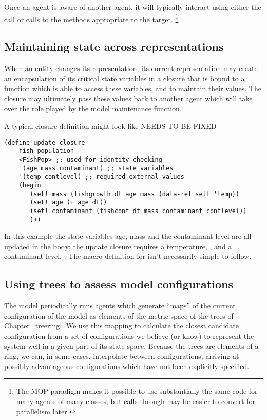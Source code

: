 Once an agent is aware of another agent, it will typically interact
using either the  call or calls to the methods
appropriate to the target. \footnote{The MOP paradigm makes it possible to use
substantially the same code for many agents of many classes, but calls
through  may be easier to convert for parallelism later.}


\subsection{Maintaining state across representations}

When an entity changes its representation, its current representation
may create an encapsulation of its critical state variables in a
closure that is bound to a function which is able to access these
variables, and to maintain their values. The closure may ultimately pass these
values back to another agent which will take over the role played by
the model maintenance function.

A typical closure definition might look like
\Huge{NEEDS TO BE FIXED}
\begin{verbatim}
(define-update-closure 
    fish-population
    <FishPop> ;; used for identity checking
    '(age mass contaminant) ;; state variables 
    '(temp contlevel) ;; required external values
    (begin
       (set! mass (fishgrowth dt age mass (data-ref self 'temp))
       (set! age (+ age dt))
       (set! contaminant (fishcont dt mass contaminant contlevel))
       )))
\end{verbatim}
In this example the state-variables age, mass and the contaminant
level are all updated in the body; the update closure requires a
temperature, , and a contaminant level, .
The macro definition for  isn't
necessarily simple to follow.

\subsection{Using trees to assess model configurations}

The model periodically runs  agents which generate
``maps'' of the current configuration of the model as elements of
the metric-space of the trees of Chapter~\ref{treering}.  We use
this mapping to calculate the closest candidate configuration from a
set of configurations we believe (or know) to represent the system
well in a given part of its state space. Because the trees are
elements of a ring, we can, in some cases, interpolate between
configurations, arriving at possibly advantageous configurations which
have not been explicitly specified.

